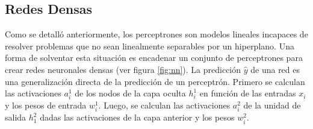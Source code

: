 \subsection{Redes Densas}
Como se detalló anteriormente, los perceptrones son modelos lineales incapaces de resolver problemas que no sean
linealmente separables por un hiperplano. Una forma de solventar esta situación es encadenar un conjunto de
perceptrones para crear redes neuronales densas (ver figura \ref{fig:nn}). La predicción $\hat{y}$ de una red es una
generalización directa de la predicción de un perceptrón. Primero se calculan las activaciones $a_i^1$ de los nodos de
la capa oculta $h_i^1$ en función de las entradas $x_i$ y los pesos de entrada $w_i^1$. Luego, se calculan las
activaciones $a_i^2$ de la unidad de salida $h_1^2$ dadas las activaciones de la capa anterior y los pesos $w_i^2$.

